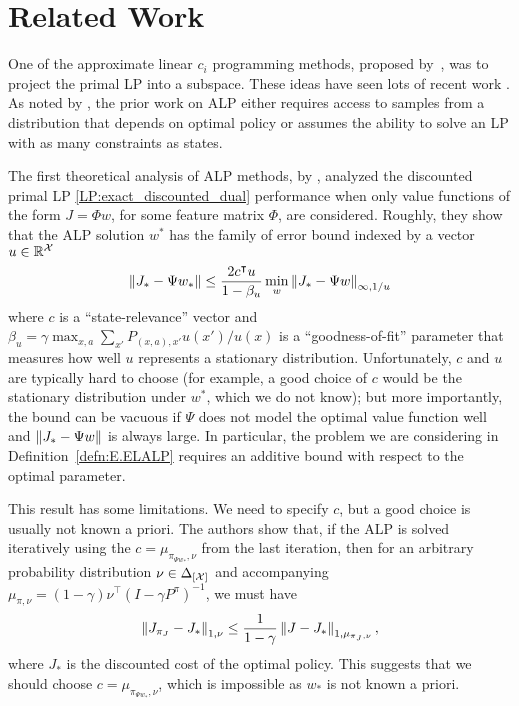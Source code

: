 \documentclass[11pt]{article}
\begin{document}
\section{Related Work}
\label{sec:related_work}
One of the approximate linear $c_i$ programming methods, proposed by~\cite{Schweitzer-Seidmann-1985}, was to project the primal LP into a subspace. These ideas have seen lots of recent work \citep{DeFarias-VanRoy-2003,
  deFarias-VanRoy-NIPS-2003, Hauskrecht-Kveton-2003,
  Guestrin-Hauskrecht-Kveton-2004, Petrik-Zilberstein-2009,
  Desai-Farias-Moallemi-2012}. As noted by
\cite{Desai-Farias-Moallemi-2012}, the prior work on ALP either
requires access to samples from a distribution that depends on optimal
policy or assumes the ability to solve an LP with as many constraints
as states.

The first theoretical analysis of ALP methods, by \cite{DeFarias-VanRoy-2003}, analyzed the discounted primal LP \eqref{LP:exact_discounted_dual} performance
when only value functions of the form $J=\Phi w$, for some feature matrix $\Phi$, are considered. Roughly, they show that the ALP solution $w^*$ has the family of error bound indexed by a vector $u\in\mathbb R^{\cal X}$
\begin{equation}
\label{eq:ALP-apprx}
\left\Vert J_* - \Psi w_*\right\Vert \le
\frac{2 c^\intercal u}{1-\beta_{u}} \min_{w} \left\Vert J_* - \Psi w\right\Vert_{\infty, 1/u}
\end{equation}
where $c$ is a ``state-relevance'' vector and $\beta_u = \gamma \max_{x,a} \sum_{x'} P_{(x,a), x'} u(x')/u(x)$ is a ``goodness-of-fit'' parameter that measures how well $u$ represents a stationary distribution. Unfortunately, $c$ and $u$ are typically hard to choose (for example, a good choice of $c$ would be the stationary distribution under $w^*$, which we do not know); but more importantly, the bound can be vacuous if $\Psi$ does not model the optimal value function well and $\left\Vert J_* - \Psi w\right\Vert$ is always large. In particular, the problem we are considering in Definition~\ref{defn:E.ELALP} requires an additive bound with respect to the optimal parameter.


This result has some limitations. We need to specify $c$, but a good choice is usually not known a priori. The authors show that, if the ALP is solved iteratively using the $c=\mu_{\pi_{\Psi w_*}, \nu}$ from the last iteration, then for an arbitrary probability distribution $\nu\in \Delta_{[{\cal X}]}$ and accompanying $\mu_{\pi, \nu} = (1-\gamma) \nu^\top (I - \gamma P^\pi)^{-1}$, we must have
\begin{equation*}
\left\Vert J_{\pi_J} - J_*\right\Vert_{1,\nu} \le \frac{1}{1-\gamma} \left\Vert J - J_*\right\Vert_{1, \mu_{\pi_J, \nu}} ,
\end{equation*}
where $J_*$ is the discounted cost of the optimal policy. This suggests that we should choose $c=\mu_{\pi_{\Psi w_*}, \nu}$, which is impossible as $w_*$ is not known a priori.
\end{document}
